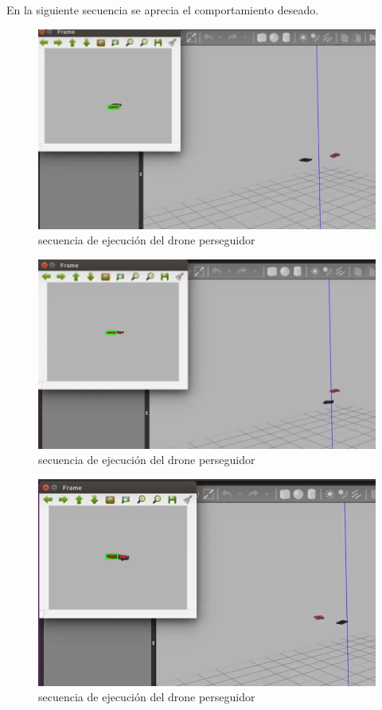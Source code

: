 En la siguiente secuencia se aprecia el comportamiento deseado.

\begin{figure}[H]
    \centering
    \includegraphics[scale=0.50]{img/cat1.PNG}
  	\caption{secuencia de ejecución del drone perseguidor}
  	\label{fig:drone-pers}
\end{figure}
\begin{figure}[H]
    \centering
    \includegraphics[scale=0.50]{img/cat2.PNG}
  	\caption{secuencia de ejecución del drone perseguidor}
  	\label{fig:drone-pers}
\end{figure}
\begin{figure}[H]
    \centering
    \includegraphics[scale=0.50]{img/cat3.PNG}
  	\caption{secuencia de ejecución del drone perseguidor}
  	\label{fig:drone-pers}
\end{figure}



